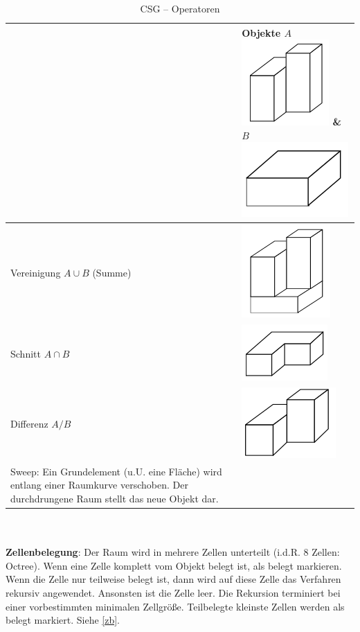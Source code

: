 \begin{table}[!hb]
\centering
\begin{tabular}{|p{6.5cm}|p{6.5cm}|}
\hline
 & Objekte $A$ \includegraphics[width=.07\textwidth]{figures/ch02_a.png} \& $B$ \includegraphics[width=.07\textwidth]{figures/ch02_b.png}\\
\hline
Vereinigung $A \cup B$ (Summe) & \includegraphics[width=.07\textwidth]{figures/ch02_ab.png}\\
\hline
Schnitt $A \cap B$ & \includegraphics[width=.07\textwidth]{figures/ch02_ab1.png} \\
\hline
Differenz $A / B$ & \includegraphics[width=.07\textwidth]{figures/ch02_ab2.png}\\
\hline
Sweep:
Ein Grundelement (u.U. eine Fläche) wird entlang einer Raumkurve
verschoben. Der durchdrungene Raum stellt das neue Objekt dar. & \\
\hline
\end{tabular}
\caption{CSG -- Operatoren}
\label{tab:csg_ops}
\end{table}\\ \\
\textbf{Zellenbelegung}:
Der Raum wird in mehrere Zellen unterteilt (i.d.R. 8 Zellen: \glqq Octree\grqq).
Wenn eine Zelle komplett vom Objekt belegt ist, als \glqq belegt\grqq{} markieren.
Wenn die Zelle nur teilweise belegt ist, dann wird auf diese Zelle das
Verfahren rekursiv angewendet. Ansonsten ist die Zelle leer.
Die Rekursion terminiert bei einer vorbestimmten minimalen Zellgröße.
Teilbelegte kleinste Zellen werden als belegt markiert. Siehe \autoref{zb}.
